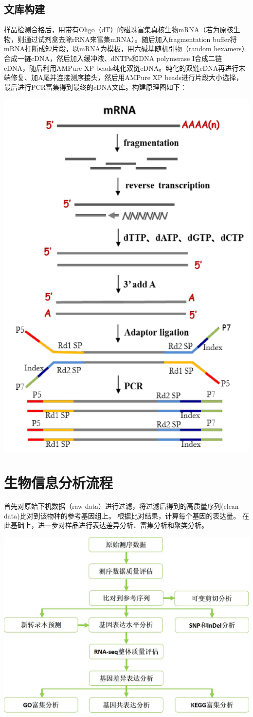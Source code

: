 \documentclass[10pt, oneside,a4paper]{article}
\begin{document}
\subsection{文库构建}
样品检测合格后，用带有Oligo（dT）的磁珠富集真核生物mRNA（若为原核生物，则通过试剂盒去除rRNA来富集mRNA）。随后加入fragmentation buffer将mRNA打断成短片段，以mRNA为模板，用六碱基随机引物（random hexamers）合成一链cDNA，然后加入缓冲液、dNTPs和DNA polymerase I合成二链 cDNA，随后利用AMPure XP beads纯化双链cDNA。纯化的双链cDNA再进行末端修复、加A尾并连接测序接头，然后用AMPure XP beads进行片段大小选择，最后进行PCR富集得到最终的cDNA文库。构建原理图如下：
\begin{center}
\includegraphics[width=60 mm, keepaspectratio]{./source/library_process.jpg}
\end{center}
\section{生物信息分析流程}
首先对原始下机数据（raw data）进行过滤，将过滤后得到的高质量序列(clean data)比对到该物种的参考基因组上。 
根据比对结果，计算每个基因的表达量。 在此基础上，进一步对样品进行表达差异分析、富集分析和聚类分析。
\begin{center}
\includegraphics[width=100 mm, keepaspectratio]{./source/als_proc.jpg}
\end{center}
\newpage
\end{document}

